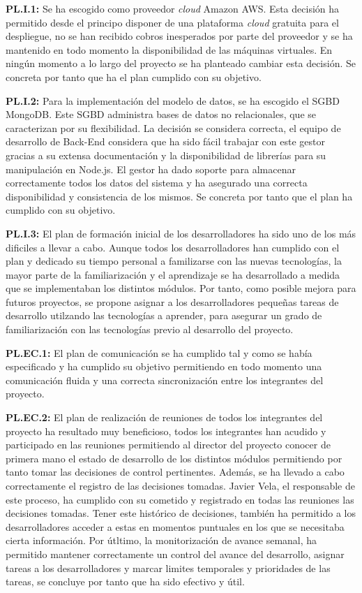 \documentclass{article}
\begin{document}
\textbf{PL.I.1:}
Se ha escogido como proveedor \textit{cloud} Amazon AWS. Esta decisión ha permitido desde el principo disponer de una plataforma \textit{cloud} gratuita para el despliegue, no se han recibido cobros inesperados por parte del proveedor y se ha mantenido en todo momento la disponibilidad de las máquinas virtuales. En ningún momento a lo largo del proyecto se ha planteado cambiar esta decisión. Se concreta por tanto que ha el plan cumplido con su objetivo.

\textbf{PL.I.2:}
Para la implementación del modelo de datos, se ha escogido el SGBD MongoDB. Este SGBD administra bases de datos no relacionales, que se caracterizan por su flexibilidad. La decisión se considera correcta, el equipo de desarrollo de Back-End considera que ha sido fácil trabajar con este gestor gracias a su extensa documentación y la disponibilidad de librerías para su manipulación en Node.js. El gestor ha dado soporte para almacenar correctamente todos los datos del sistema y ha asegurado una correcta disponibilidad y consistencia de los mismos. Se concreta por tanto que el plan ha cumplido con su objetivo.

\textbf{PL.I.3:}
El plan de formación inicial de los desarrolladores ha sido uno de los más dificiles a llevar a cabo. Aunque todos los desarrolladores han cumplido con el plan y dedicado su tiempo personal a familizarse con las nuevas tecnologías, la mayor parte de la familiarización y el aprendizaje se ha desarrollado a medida que se implementaban los distintos módulos. Por tanto, como posible mejora para futuros proyectos, se propone asignar a los desarrolladores pequeñas tareas de desarrollo utilzando las tecnologías a aprender, para asegurar un grado de familiarización con las tecnologías previo al desarrollo del proyecto.

\textbf{PL.EC.1:}
El plan de comunicación se ha cumplido tal y como se había especificado y ha cumplido su objetivo permitiendo en todo momento una comunicación fluida y una correcta sincronización entre los integrantes del proyecto.

\textbf{PL.EC.2:}
El plan de realización de reuniones de todos los integrantes del proyecto ha resultado muy beneficioso, todos los integrantes han acudido y participado en las reuniones permitiendo al director del proyecto conocer de primera mano el estado de desarrollo de los distintos módulos permitiendo por tanto tomar las decisiones de control pertinentes.
Además, se ha llevado a cabo correctamente el registro de las decisiones tomadas. Javier Vela, el responsable de este proceso, ha cumplido con su cometido y registrado en todas las reuniones las decisiones tomadas. Tener este histórico de decisiones, también ha permitido a los desarrolladores acceder a estas en momentos puntuales en los que se necesitaba cierta información. Por útltimo, la monitorización de avance semanal, ha permitido mantener correctamente un control del avance del desarrollo, asignar tareas a los desarrolladores y marcar limites temporales y prioridades de las tareas, se concluye por tanto que ha sido efectivo y útil.
\end{document}
